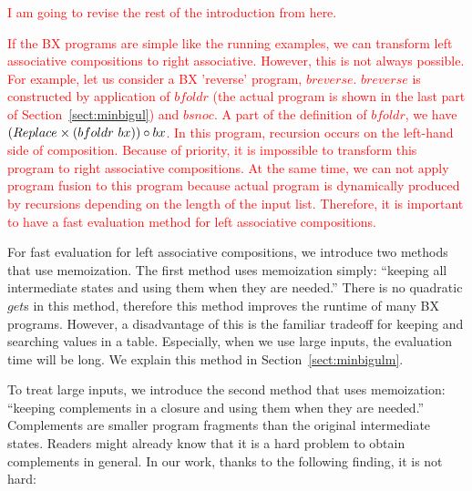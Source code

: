 
\textcolor{red}{I am going to revise the rest of the introduction from here.}

\textcolor{red}{If the BX programs are simple like the running examples, we can transform left associative compositions to right associative. However, this is not always possible. For example, let us consider a BX 'reverse' program, $breverse$. $breverse$ is constructed by application of $bfoldr$ (the actual program is shown in the last part of Section~\ref{sect:minbigul}) and $bsnoc$.
A part of the definition of $bfoldr$, we have $(Replace \times (bfoldr \ bx)) \circ bx$. In this program, recursion occurs on the left-hand side of composition. Because of priority, it is impossible to transform this program to right associative compositions. At the same time, we can not apply program fusion \cite{Wadler:1988:DTP:80099.80104} to this program because actual program is dynamically produced by recursions depending on the length of the input list. Therefore, it is important to have a fast evaluation method for left associative compositions.}


For fast evaluation for left associative compositions, we introduce two methods that use memoization.
The first method uses memoization simply: ``keeping all intermediate states and using them when they are needed.'' There is no quadratic $get$s in this method, therefore this method improves the runtime of many BX programs. However, a disadvantage of this is the familiar tradeoff for keeping and searching values in a table. Especially, when we use large inputs, the evaluation time will be long. We explain this method in Section~\ref{sect:minbigulm}.

To treat large inputs, we introduce the second method that uses memoization: ``keeping complements in a closure and using them when they are needed.'' Complements are smaller program fragments than the original intermediate states.
Readers might already know that it is a hard problem to obtain complements in general. In our work, thanks to the following finding, it is not hard:

